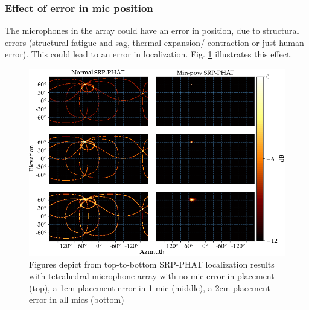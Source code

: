 \subsubsection{Effect of error in mic position}
The microphones in the array could have an error in position, due to structural errors (structural fatigue and sag, thermal expansion/ contraction or just human error). This could lead to an error in localization. Fig. \ref{fig:micErrPos} illustrates this effect. 
\begin{figure}[H]
    \centering
    \includegraphics[width=\textwidth]{Figures/micErrPosSim.png}
    \caption{Figures depict from top-to-bottom SRP-PHAT localization results with tetrahedral microphone array with no mic error in placement (top), a 1cm placement error in 1 mic (middle), a 2cm placement error in all mics (bottom)}
    \label{fig:micErrPos}
\end{figure}

